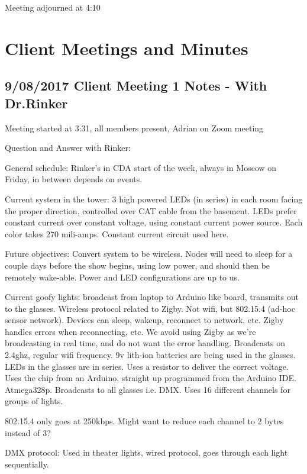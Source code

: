 \documentclass[12pt]{article}
\begin{document}
Meeting adjourned at 4:10

\clearpage




\section{Client Meetings and Minutes}

	\subsection{9/08/2017 Client Meeting 1 Notes - With Dr.Rinker}

	Meeting started at 3:31, all members present, Adrian on Zoom meeting

Question and Answer with Rinker:

General schedule: Rinker's in CDA start of the week, always in Moscow on Friday, in between depends on events.

Current system in the tower: 3 high powered LEDs (in series) in each room facing the proper direction, controlled over CAT cable from the basement. LEDs prefer constant current over constant voltage, using constant current power source. Each color takes 270 mili-amps. Constant current circuit used here.

Future objectives: Convert system to be wireless. Nodes will need to sleep for a couple days before the show begins, using low power, and should then be remotely wake-able. Power and LED configurations are up to us.

Current goofy lights: broadcast from laptop to Arduino like board, transmits out to the glasses. Wireless protocol related to Zigby. Not wifi, but 802.15.4 (ad-hoc sensor network). Devices can sleep, wakeup, reconnect to network, etc. Zigby handles errors when reconnecting, etc. We avoid using Zigby as we’re broadcasting in real time, and do not want the error handling. Broadcasts on 2.4ghz, regular wifi frequency. 9v lith-ion batteries are being used in the glasses. LEDs in the glasses are in series. Uses a resistor to deliver the correct voltage. Uses the chip from an Arduino, straight up programmed from the Arduino IDE. Atmega328p. Broadcasts to all glasses i.e. DMX. Uses 16 different channels for groups of lights.

802.15.4 only goes at 250kbps. Might want to reduce each channel to 2 bytes instead of 3?

DMX protocol: Used in theater lights, wired protocol, goes through each light sequentially.
\end{document}
